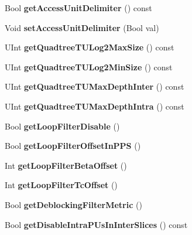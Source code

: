 \begin{DoxyCompactItemize}
Bool {\bfseries get\+Access\+Unit\+Delimiter} () const
\item 
\mbox{\label{class_t_enc_cfg_a2a5bc4c0b75906e2fb78462679eb4747}} 
Void {\bfseries set\+Access\+Unit\+Delimiter} (Bool val)
\item 
\mbox{\label{class_t_enc_cfg_ac5461144469017db066b7f09f87f23b5}} 
U\+Int {\bfseries get\+Quadtree\+T\+U\+Log2\+Max\+Size} () const
\item 
\mbox{\label{class_t_enc_cfg_ad59f6d2a3c6306fec3183ae5b031b67f}} 
U\+Int {\bfseries get\+Quadtree\+T\+U\+Log2\+Min\+Size} () const
\item 
\mbox{\label{class_t_enc_cfg_a0b8f1a269814733cd091d8b325341ed6}} 
U\+Int {\bfseries get\+Quadtree\+T\+U\+Max\+Depth\+Inter} () const
\item 
\mbox{\label{class_t_enc_cfg_a217f3567a2db7ba222bc288ff3d2ff65}} 
U\+Int {\bfseries get\+Quadtree\+T\+U\+Max\+Depth\+Intra} () const
\item 
\mbox{\label{class_t_enc_cfg_a8052b292ce5daf90d86f3089b8f7dd30}} 
Bool {\bfseries get\+Loop\+Filter\+Disable} ()
\item 
\mbox{\label{class_t_enc_cfg_aff8887f1588b440aaad31eb082a1a6ee}} 
Bool {\bfseries get\+Loop\+Filter\+Offset\+In\+P\+PS} ()
\item 
\mbox{\label{class_t_enc_cfg_ae7629f1ff084ffedbb5dc8f88e927fc6}} 
Int {\bfseries get\+Loop\+Filter\+Beta\+Offset} ()
\item 
\mbox{\label{class_t_enc_cfg_adb391b2c38be45b8bc052829a866e4d2}} 
Int {\bfseries get\+Loop\+Filter\+Tc\+Offset} ()
\item 
\mbox{\label{class_t_enc_cfg_ab74c62066f8ef314afc6d60d0eae3155}} 
Bool {\bfseries get\+Deblocking\+Filter\+Metric} ()
\item 
\mbox{\label{class_t_enc_cfg_aca4524a7d1430e2a2e5e1cb88b8cc655}} 
Bool {\bfseries get\+Disable\+Intra\+P\+Us\+In\+Inter\+Slices} () const

\end{DoxyCompactItemize}
